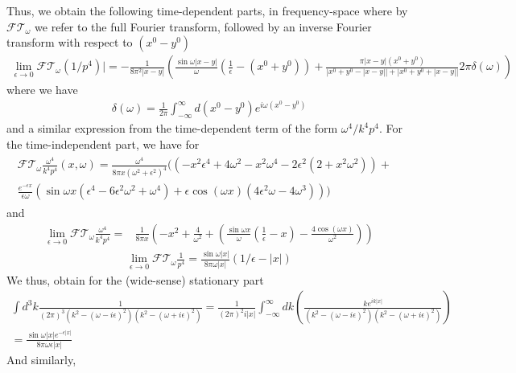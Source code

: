 \documentclass[aps,preprintnumbers,superscriptaddress,longbibliography]{revtex4-1}
\begin{document}
Thus, we obtain the following time-dependent parts, in frequency-space where by $\mathcal{FT}_{\omega}$ we refer to the full Fourier transform, followed by an inverse Fourier transform with respect to $(x^0-y^0)$  
\begin{align}
  \lim_{\epsilon\rightarrow0}  \mathcal{FT}_{\omega}(1/p^4)|=-\frac{1}{8\pi^2|x-y|}(\frac{\sin{\omega|x-y|}}{\omega}(\frac{1}{\epsilon}-(x^0+y^0))+\frac{\pi|x-y|(x^0+y^0) }{|x^0+y^0-|x-y||+|x^0+y^0+|x-y||}2\pi\delta(\omega))
\end{align}
where we have 
\begin{align}
    \delta(\omega)=\frac{1}{2\pi}\int^\infty_{-\infty}d(x^0-y^0)e^{i\omega(x^0-y^0)}
\end{align}
and a similar expression from the time-dependent term of the form $\omega^4/k^4p^4$.
For the time-independent part, we have for
\begin{align}
  \begin{split}  \mathcal{FT}_{\omega}\frac{\omega^4}{k^4p^4}(x,\omega)=\frac{\omega^4}{8\pi x(\omega^2+\epsilon^2)^4}((-x^2\epsilon^4+4\omega^2-x^2\omega^4-2\epsilon^2(2+x^2\omega^2))+&\\\frac{e^{-\epsilon x}}{\epsilon\omega}(\sin{\omega x}(\epsilon^4-6\epsilon^2\omega^2+\omega^4)+\epsilon\cos(\omega x)(4\epsilon^2\omega-4\omega^3)))
    \end{split}
\end{align}
and 
\begin{align}
\lim_{\epsilon\rightarrow0}\mathcal{FT}_{\omega}\frac{\omega^4}{k^4p^4}=&\frac{1}{8\pi x}(-x^2+\frac{4}{\omega^2}+(\frac{\sin{\omega x}}{\omega}(\frac{1}{\epsilon}-x)-\frac{4\cos(\omega x)}{\omega^2}))
\end{align}
\begin{align}
\lim_{\epsilon\rightarrow0}\mathcal{FT}_{\omega}\frac{1}{p^4}=\frac{\sin{\omega|x|}}{8\pi\omega|x|}(1/\epsilon-|x|)
    \end{align}
We thus, obtain for the (wide-sense) stationary part
\begin{align}
  \int d^3k\frac{1}{(2\pi)^3(k^2-(\omega-i\epsilon)^2)(k^2-(\omega+i\epsilon)^2)}=\frac{1}{(2\pi)^2i|x|}\int ^{\infty}_{-\infty}dk(\frac{ke^{ik|x|}}{(k^2-(\omega-i\epsilon)^2)(k^2-(\omega+i\epsilon)^2)})&\\=\frac{\sin{\omega|x|e^{-\epsilon|x|}}}{8\pi\omega\epsilon|x|} 
\end{align}And similarly,
\end{document}
